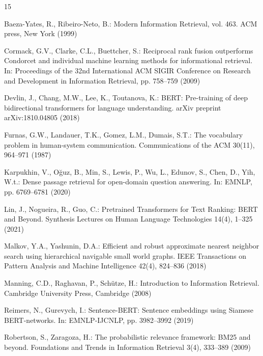 \documentclass[pdflatex,sn-mathphys-num]{sn-jnl}%
\theoremstyle{thmstyleone}%
\theoremstyle{thmstyletwo}%
\theoremstyle{thmstylethree}%
\begin{document}
\begin{thebibliography}{15}

Baeza-Yates, R., Ribeiro-Neto, B.: Modern Information Retrieval, vol. 463. ACM press, New York (1999)

Cormack, G.V., Clarke, C.L., Buettcher, S.: Reciprocal rank fusion outperforms Condorcet and individual machine learning methods for informational retrieval. In: Proceedings of the 32nd International ACM SIGIR Conference on Research and Development in Information Retrieval, pp. 758--759 (2009)

Devlin, J., Chang, M.W., Lee, K., Toutanova, K.: BERT: Pre-training of deep bidirectional transformers for language understanding. arXiv preprint arXiv:1810.04805 (2018)

Furnas, G.W., Landauer, T.K., Gomez, L.M., Dumais, S.T.: The vocabulary problem in human-system communication. Communications of the ACM 30(11), 964--971 (1987)

Karpukhin, V., O{\u{g}}uz, B., Min, S., Lewis, P., Wu, L., Edunov, S., Chen, D., Yih, W.t.: Dense passage retrieval for open-domain question answering. In: EMNLP, pp. 6769--6781 (2020)

Lin, J., Nogueira, R., Guo, C.: Pretrained Transformers for Text Ranking: BERT and Beyond. Synthesis Lectures on Human Language Technologies 14(4), 1--325 (2021)

Malkov, Y.A., Yashunin, D.A.: Efficient and robust approximate nearest neighbor search using hierarchical navigable small world graphs. IEEE Transactions on Pattern Analysis and Machine Intelligence 42(4), 824--836 (2018)

Manning, C.D., Raghavan, P., Sch{\"u}tze, H.: Introduction to Information Retrieval. Cambridge University Press, Cambridge (2008)

Reimers, N., Gurevych, I.: Sentence-BERT: Sentence embeddings using Siamese BERT-networks. In: EMNLP-IJCNLP, pp. 3982--3992 (2019)

Robertson, S., Zaragoza, H.: The probabilistic relevance framework: BM25 and beyond. Foundations and Trends in Information Retrieval 3(4), 333--389 (2009)


\end{thebibliography}
\end{document}
